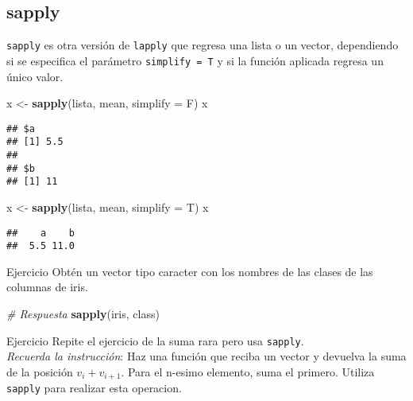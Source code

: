 \documentclass[]{article}
\newenvironment{Shaded}{\begin{snugshade}}{\end{snugshade}}
\newcommand{\KeywordTok}[1]{\textcolor[rgb]{0.13,0.29,0.53}{\textbf{{#1}}}}
\newcommand{\DataTypeTok}[1]{\textcolor[rgb]{0.13,0.29,0.53}{{#1}}}
\newcommand{\StringTok}[1]{\textcolor[rgb]{0.31,0.60,0.02}{{#1}}}
\newcommand{\CommentTok}[1]{\textcolor[rgb]{0.56,0.35,0.01}{\textit{{#1}}}}
\newcommand{\NormalTok}[1]{{#1}}
\begin{document}
\subsection{sapply}\label{sapply}

\texttt{sapply} es otra versión de \texttt{lapply} que regresa una lista
o un vector, dependiendo si se especifica el parámetro
\texttt{simplify = T} y si la función aplicada regresa un único valor.

\begin{Shaded}
\begin{Highlighting}[]
\NormalTok{x <-}\StringTok{ }\KeywordTok{sapply}\NormalTok{(lista, mean, }\DataTypeTok{simplify =} \NormalTok{F)}
\NormalTok{x}
\end{Highlighting}
\end{Shaded}

\begin{verbatim}
## $a
## [1] 5.5
## 
## $b
## [1] 11
\end{verbatim}

\begin{Shaded}
\begin{Highlighting}[]
\NormalTok{x <-}\StringTok{ }\KeywordTok{sapply}\NormalTok{(lista, mean, }\DataTypeTok{simplify =} \NormalTok{T)}
\NormalTok{x}
\end{Highlighting}
\end{Shaded}

\begin{verbatim}
##    a    b 
##  5.5 11.0
\end{verbatim}

\renewcommand\bcStyleTitre[1]{\large\textcolor{bbblack}{#1}}

\begin{bclogo}[
  couleur=llred,
  arrondi=0,
  logo=\bcstop,
  barre=none,
  noborder=true]{Ejercicio}
Obtén un vector tipo caracter con los nombres de las clases de 
las columnas de iris.
\end{bclogo}

\begin{Shaded}
\begin{Highlighting}[]
\CommentTok{# Respuesta}
\KeywordTok{sapply}\NormalTok{(iris, class)}
\end{Highlighting}
\end{Shaded}

\renewcommand\bcStyleTitre[1]{\large\textcolor{bbblack}{#1}}

\begin{bclogo}[
  couleur=llred,
  arrondi=0,
  logo=\bcstop,
  barre=none,
  noborder=true]{Ejercicio}
Repite el ejercicio de la suma rara pero usa \texttt{sapply}.\\

\textit{Recuerda la instrucción}: Haz una función que reciba un vector y devuelva 
la suma de la posición $v_i + v_{i + 1}$. Para el n-esimo elemento, 
suma el primero. Utiliza \texttt{sapply} para realizar esta operacion.
\end{bclogo}
\end{document}

